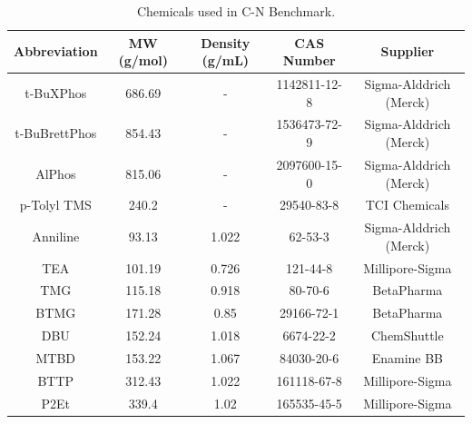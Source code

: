\begin{table}
\caption{Chemicals used in C-N Benchmark.}
\begin{tabular}{ccccc}
\textbf{Abbreviation}             & \textbf{MW (g/mol)} & \textbf{Density (g/mL)} & \textbf{CAS Number} & \textbf{Supplier} \\
\hline
t-BuXPhos     & 686.69 & -     & 1142811-12-8 & Sigma-Alddrich (Merck) \\
t-BuBrettPhos & 854.43 & -     & 1536473-72-9 & Sigma-Alddrich (Merck) \\
AlPhos        & 815.06 & -     & 2097600-15-0 & Sigma-Alddrich (Merck) \\
p-Tolyl TMS   & 240.2               & -                       & 29540-83-8          & TCI Chemicals     \\
Anniline      & 93.13  & 1.022 & 62-53-3      & Sigma-Alddrich (Merck) \\
TEA           & 101.19 & 0.726 & 121-44-8     & Millipore-Sigma        \\
TMG           & 115.18 & 0.918 & 80-70-6      & BetaPharma             \\
BTMG          & 171.28 & 0.85  & 29166-72-1   & BetaPharma             \\
DBU           & 152.24 & 1.018 & 6674-22-2    & ChemShuttle            \\
MTBD          & 153.22 & 1.067 & 84030-20-6   & Enamine BB             \\
BTTP          & 312.43 & 1.022 & 161118-67-8  & Millipore-Sigma        \\
P2Et          & 339.4  & 1.02  & 165535-45-5  & Millipore-Sigma       
\end{tabular}
\label{tab:cn_benchmark_prices_1}
\end{table}

